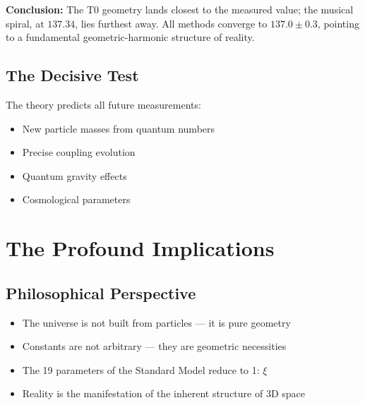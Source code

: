 	\begin{table}[h]
		\centering
		\caption{Detailed analysis of the different approaches}
	\end{table}
	
	\textbf{Conclusion:} The T0 geometry lands closest to the measured value; the musical spiral, at $137.34$, lies furthest away. All methods converge to $137.0 \pm 0.3$, pointing to a fundamental geometric-harmonic structure of reality.
	
	\subsection{The Decisive Test}
	
	The theory predicts all future measurements:
	\begin{itemize}
		\item New particle masses from quantum numbers
		\item Precise coupling evolution
		\item Quantum gravity effects
		\item Cosmological parameters
	\end{itemize}
	
	\section{The Profound Implications}
	
	\subsection{Philosophical Perspective}
	
	\begin{tcolorbox}[colback=orange!5!white,colframe=orange!75!black,title=The New Understanding]
		\begin{itemize}
			\item The universe is not built from particles — it is pure geometry
			\item Constants are not arbitrary — they are geometric necessities
			\item The 19 parameters of the Standard Model reduce to 1: $\xi$
			\item Reality is the manifestation of the inherent structure of 3D space
		\end{itemize}
	\end{tcolorbox}
	
